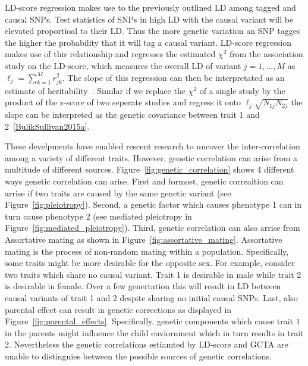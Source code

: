 LD-score regression makes use to the previously outlined LD among tagged and causal SNPs.
Test statistics of SNPs in high LD with the causal variant will be elevated proportioal to their LD\@.
Thus the more genetic variation an SNP tagges the higher the probability that it will tag a causal variant.
LD-score regression makes use of this relationship and regresses the estimated $\chi^2$ from the association study on the LD-score, which measures the overall LD of variant $j = 1, \ldots, M$ as $\ell_j = \sum^M_{k=1} r^2_{jk}$. 
The slope of this regression can then be interpretated as an estimate of heritability~\cite{Bulik-Sullivan2015}.
Similar if we replace the $\chi^2$ of a single study by the product of the z-score of two seperate studies and regress it onto $\ell_j \sqrt{N_{1j}N_{2j}}$ the slope can be interpreted as the genetic covariance between trait 1 and 2~\ref{BulikSullivan2015a}.

These develpments have enabled rescent research to uncover the inter-correlation among a variety of different traits.
However, genetic correlation can arise from a multitude of different sources.
Figure~\ref{fig:genetic_correlation} shows 4 different ways genetic correlation can arise.
First and formost, genetic correaltion can arrise if two traits are caused by the same genetic variant (see Figure~\ref{fig:pleiotropy}).
Second, a genetic factor which causes phenotype 1 can in turn cause phenotype 2 (see mediated pleiotropy in Figure~\ref{fig:mediated_pleiotropy}).
Third, genetic correlation can also arrise from Assortative mating as shown in Figure~\ref{fig:assortative_mating}.
Assortative mating is the process of non-random mating within a population.
Specifically, some traits might be more desirable for the opposite sex.
For example, consider two traits which share no causal variant.
Trait 1 is desirable in male while trait 2 is desirable in female.
Over a few genertation this will result in LD between causal variants of trait 1 and 2 despite sharing no initial causal SNPs. 
Last, also parental effect can result in genetic corrections as displayed in Figure~\ref{fig:parental_effects}.
Specifically, genetic components which cause trait $1$ in the parents might influence the child enviornment which in turn results in trait 2. 
Nevertheless the genetic correlations estiamted by LD-score and GCTA are unable to distinguies between the possible sources of genetic correlations.

